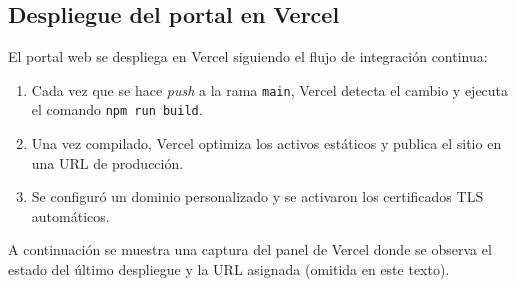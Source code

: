 \subsection{Despliegue del portal en Vercel}

\begin{large}
	
El portal web se despliega en Vercel siguiendo el flujo de integración continua:

\begin{enumerate}
  \item Cada vez que se hace \emph{push} a la rama \texttt{main}, Vercel detecta el cambio y ejecuta el comando \texttt{npm run build}.
  \item Una vez compilado, Vercel optimiza los activos estáticos y publica el sitio en una URL de producción.
  \item Se configuró un dominio personalizado y se activaron los certificados TLS automáticos.
\end{enumerate}

A continuación se muestra una captura del panel de Vercel donde se observa el estado del último despliegue y la URL asignada (omitida en este texto).

\end{large}